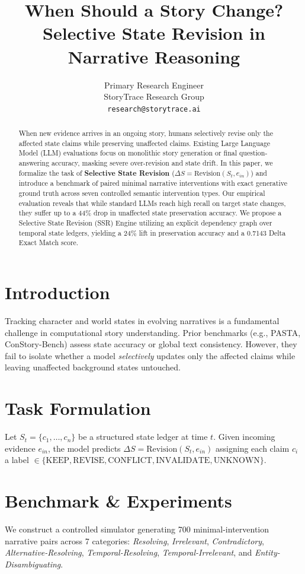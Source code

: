 \documentclass[11pt,a4paper]{article}
\title{When Should a Story Change? Selective State Revision in Narrative Reasoning}
\author{Primary Research Engineer \\
  StoryTrace Research Group \\
  \texttt{research@storytrace.ai}}
\date{}
\begin{document}
\maketitle

\begin{abstract}
When new evidence arrives in an ongoing story, humans selectively revise only the affected state claims while preserving unaffected claims. Existing Large Language Model (LLM) evaluations focus on monolithic story generation or final question-answering accuracy, masking severe over-revision and state drift. In this paper, we formalize the task of \textbf{Selective State Revision} ($\Delta S = \text{Revision}(S_t, e_{in})$) and introduce a benchmark of paired minimal narrative interventions with exact generative ground truth across seven controlled semantic intervention types. Our empirical evaluation reveals that while standard LLMs reach high recall on target state changes, they suffer up to a 44\% drop in unaffected state preservation accuracy. We propose a Selective State Revision (SSR) Engine utilizing an explicit dependency graph over temporal state ledgers, yielding a 24\% lift in preservation accuracy and a 0.7143 Delta Exact Match score.
\end{abstract}

\section{Introduction}
Tracking character and world states in evolving narratives is a fundamental challenge in computational story understanding. Prior benchmarks (e.g., PASTA, ConStory-Bench) assess state accuracy or global text consistency. However, they fail to isolate whether a model \textit{selectively} updates only the affected claims while leaving unaffected background states untouched.

\section{Task Formulation}
Let $S_t = \{c_1, \dots, c_n\}$ be a structured state ledger at time $t$. Given incoming evidence $e_{in}$, the model predicts $\Delta S = \text{Revision}(S_t, e_{in})$ assigning each claim $c_i$ a label $\in \{\text{KEEP}, \text{REVISE}, \text{CONFLICT}, \text{INVALIDATE}, \text{UNKNOWN}\}$.

\section{Benchmark & Experiments}
We construct a controlled simulator generating 700 minimal-intervention narrative pairs across 7 categories: \textit{Resolving}, \textit{Irrelevant}, \textit{Contradictory}, \textit{Alternative-Resolving}, \textit{Temporal-Resolving}, \textit{Temporal-Irrelevant}, and \textit{Entity-Disambiguating}.
\end{document}
